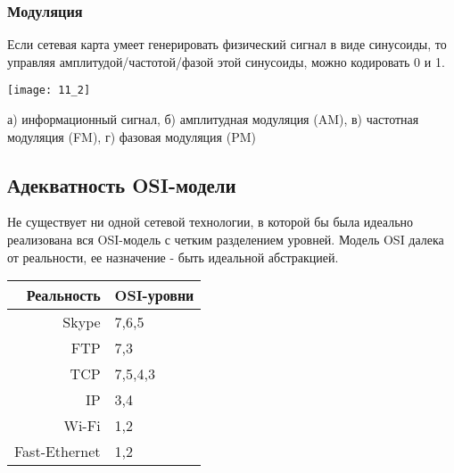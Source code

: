 \subsubsection{Модуляция}
Если сетевая карта умеет генерировать физический сигнал в виде синусоиды, то управляя амплитудой/частотой/фазой этой синусоиды, можно кодировать 0 и 1.
\\
\begin{minipage}{\textwidth}
\texttt{[image: 11\_2]}
\begin{center}
а) информационный сигнал, б) амплитудная модуляция (AM), в) частотная модуляция (FM), г) фазовая модуляция (PM)
\end{center}
\end{minipage}
\subsection{Адекватность OSI-модели}
Не существует ни одной сетевой технологии, в которой бы была идеально реализована вся OSI-модель с четким разделением уровней.
Модель OSI далека от реальности, ее назначение - быть идеальной абстракцией.
\begin{table}[!h]
\begin{tabular}{r|l}
Реальность & OSI-уровни \\
\hline
Skype & 7,6,5 \\
\hline
FTP & 7,3 \\
\hline
TCP & 7,5,4,3 \\
\hline
IP & 3,4 \\
\hline
Wi-Fi & 1,2 \\
\hline
Fast-Ethernet & 1,2 \\
\end{tabular}
\end{table}
